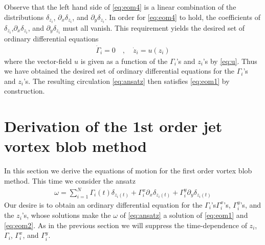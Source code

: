 \documentclass[12pt]{amsart}
\begin{document}
Observe that the left hand side of \eqref{eq:eom4}
is a linear combination of the distributions
$\delta_{z_i}$, $\partial_x\delta_{z_i}$, and $\partial_y \delta_{z_i}$.
In order for \eqref{eq:eom4} to hold, the coefficients of $\delta_{z_i}$,$\partial_x \delta_{z_i}$, and $\partial_y \delta_{z_i}$ must all vanish.
This requirement yields the desired set of ordinary differential equations
\begin{align*}
  \dot{\Gamma}_i = 0 \quad,\quad
  \dot{z}_i = u(z_i)
\end{align*}
where the vector-field $u$ is given as a function of the $\Gamma_i$'s and $z_i$'s by \eqref{eq:u}.
Thus we have obtained the desired set of ordinary differential equations for the $\Gamma_i$'s and $z_i$'s.
The resulting circulation \eqref{eq:ansatz} then satisfies \eqref{eq:eom1} by construction.

\section{Derivation of the 1st order jet vortex blob method}
\label{sec:1-vortex_blob}
In this section we derive the equations of motion for the
first order vortex blob method.
This time we consider the ansatz
\begin{align}
  \omega = \sum_{i=1}^N \Gamma_i(t) \delta_{z_i(t)} + \Gamma_i^x \partial_x \delta_{z_i(t)}
  + \Gamma_i^y \partial_y \delta_{z_i(t)}
  \label{eq:1-ansatz}
\end{align} 
Our desire is to obtain an ordinary differential equation for the $\Gamma_i$'s$\Gamma_i^x$'s, $\Gamma_i^y$'s, and the $z_i$'s,
whose solutions make the $\omega$ of \eqref{eq:ansatz} a solution of \eqref{eq:eom1} and \eqref{eq:eom2}.
As in the previous section
we will suppress the time-dependence of $z_i$, $\Gamma_i$, $\Gamma^x_i$,
and $\Gamma_i^y$.
\end{document}
